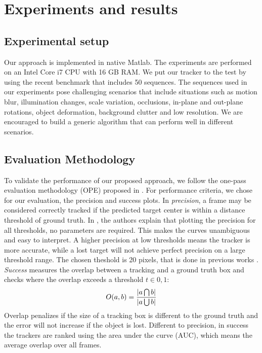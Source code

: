 \chapter{Experiments and results} %

\label{chapter5} %


\section{Experimental setup}
Our approach is implemented in native Matlab. The experiments are performed on an Intel Core i7 CPU with 16 GB RAM. We put our tracker to the test by using the recent benchmark \cite{Wu2013} that includes 50 sequences. The sequences used in our experiments pose challenging scenarios that include situations such as motion blur, illumination changes, scale variation, occlusions, in-plane and out-plane rotations, object deformation, background clutter and low resolution. We are encouraged to build a generic algorithm that can perform well in different scenarios.

\section{Evaluation Methodology}

To validate the performance of our proposed approach, we follow the one-pass evaluation methodology (OPE) proposed in \cite{Wu2013}. For performance criteria, we chose for our evaluation, the precision and success plots. In \textit{precision}, a frame may be considered correctly tracked if the predicted target center is within a distance threshold of ground truth. In \cite{Henriques2014}, the authors explain that plotting the precision for all thresholds, no parameters are required. This makes the curves unambiguous and easy to interpret. A higher precision at low thresholds means the tracker is more accurate, while a lost target will not achieve perfect precision on a large threshold range. The chosen theshold is 20 pixels, that is done in previous works \cite{Babenko2010, Wu2013, Henriques2014}. \textit{Success} measures the overlap between a tracking and a ground truth box and checks where the overlap exceeds a threshold $t \in {0,1}$:
\begin{equation}
\large
O(a,b) = \frac{|a\bigcap b|}{|a\bigcup  b|}
\end{equation}
Overlap penalizes if the size of a tracking box is different to the ground truth and the error will not increase if the object is lost. Different to precision, in success the trackers are ranked using the area under the curve (AUC), which means the average overlap over all frames.

